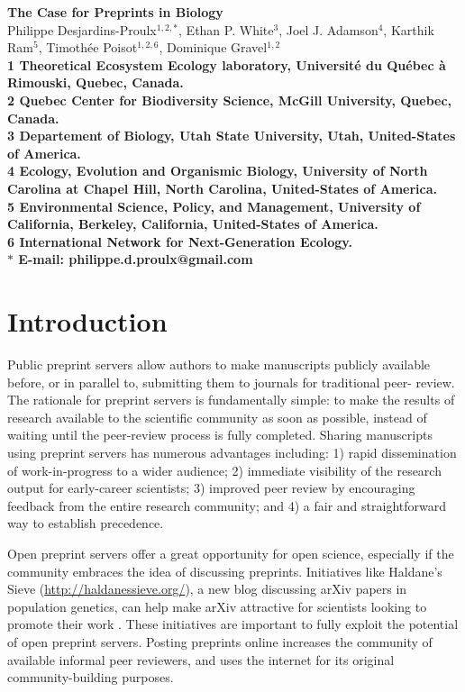 \documentclass[10pt]{article}
\date{}
\begin{document}
\begin{flushleft}
{\Large
\textbf{The Case for Preprints in Biology}
}
\\
Philippe Desjardins-Proulx$^{1, 2,\ast}$, 
Ethan P. White$^{3}$, 
Joel J. Adamson$^{4}$,
Karthik Ram$^{5}$,
Timoth\'ee Poisot$^{1,2,6}$,
Dominique Gravel$^{1,2}$
\\
\bf{1} Theoretical Ecosystem Ecology laboratory, Universit\'e du Qu\'ebec \`a Rimouski, Quebec, Canada.
\\
\bf{2} Quebec Center for Biodiversity Science, McGill University, Quebec, Canada.
\\
\bf{3} Departement of Biology, Utah State University, Utah, United-States of America.
\\
\bf{4} Ecology, Evolution and Organismic Biology, University of North Carolina at Chapel Hill, North Carolina, United-States of America.
\\
\bf{5} Environmental Science, Policy, and Management, University of California, Berkeley, California, United-States of America.
\\
\bf{6} International Network for Next-Generation Ecology.
\\
$\ast$ E-mail: philippe.d.proulx@gmail.com
\end{flushleft}

\section*{Introduction}

Public preprint servers allow authors to make manuscripts publicly available
before, or in parallel to, submitting them to journals for traditional peer-
review. The rationale for preprint servers is fundamentally simple: to make
the results of research available to the scientific community as
soon as possible, instead of waiting until the peer-review process is fully
completed.  Sharing manuscripts using preprint servers has numerous advantages
including: 1) rapid dissemination of work-in-progress to a wider audience; 2)
immediate visibility of the research output for early-career scientists; 3)
improved peer review by encouraging feedback from the entire research
community; and 4) a fair and straightforward way to establish precedence.

Open preprint servers offer a great opportunity for open science, especially if
the community embraces the idea of discussing preprints. Initiatives like
Haldane's Sieve (\href{http://haldanessieve.org/}{http://haldanessieve.org/}), a
new blog discussing arXiv papers in population genetics, can help make arXiv
attractive for scientists looking to promote their work \cite{lom12}. These
initiatives are important to fully exploit the potential of open preprint
servers. Posting preprints online increases the community of available informal
peer reviewers, and uses the internet for its original community-building
purposes.
\end{document}
